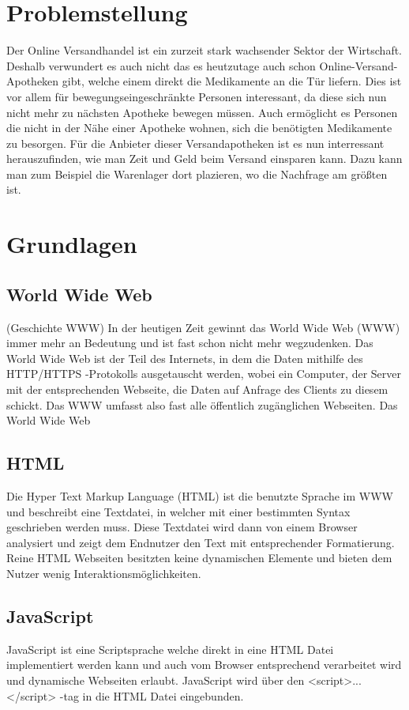 \documentclass[a4paper, twoside, 12pt]{scrreprt}
\begin{document}
\section {Problemstellung}
Der Online Versandhandel ist ein zurzeit stark wachsender Sektor der Wirtschaft.
Deshalb verwundert es auch nicht das es heutzutage auch schon Online-Versand-Apotheken gibt, welche einem direkt die Medikamente an die Tür liefern.
Dies ist vor allem für bewegungseingeschränkte Personen interessant, da diese sich nun nicht mehr zu nächsten Apotheke bewegen müssen.
Auch ermöglicht es Personen die nicht in der Nähe einer Apotheke wohnen, sich die benötigten Medikamente zu besorgen.
Für die Anbieter dieser Versandapotheken ist es nun interressant herauszufinden, wie man Zeit und Geld beim Versand einsparen kann.
Dazu kann man zum Beispiel die Warenlager dort plazieren, wo die Nachfrage am größten ist.
\section{Grundlagen}
\subsection{World Wide Web}
(Geschichte WWW)
In der heutigen Zeit gewinnt das World Wide Web (WWW) immer mehr an Bedeutung und ist fast schon nicht mehr wegzudenken.
Das World Wide Web ist der Teil des Internets, in dem die Daten mithilfe des HTTP/HTTPS -Protokolls ausgetauscht werden, wobei ein Computer, der Server mit der entsprechenden Webseite, die Daten auf Anfrage des Clients zu diesem schickt.
Das WWW umfasst also fast alle öffentlich zugänglichen Webseiten.
Das World Wide Web~\citep{www}
\subsection{HTML}
Die Hyper Text Markup Language (HTML) ist die benutzte Sprache im WWW und beschreibt eine Textdatei, in welcher mit einer bestimmten Syntax geschrieben werden muss.
Diese Textdatei wird dann von einem Browser analysiert und zeigt dem Endnutzer den Text mit entsprechender Formatierung.
Reine HTML Webseiten besitzten keine dynamischen Elemente und bieten dem Nutzer wenig Interaktionsmöglichkeiten.
\subsection{JavaScript}
JavaScript ist eine Scriptsprache welche direkt in eine HTML Datei implementiert werden kann und auch vom Browser entsprechend verarbeitet wird und dynamische Webseiten erlaubt.
JavaScript wird über den <script>...</script> -tag in die HTML Datei eingebunden.
\end{document}
